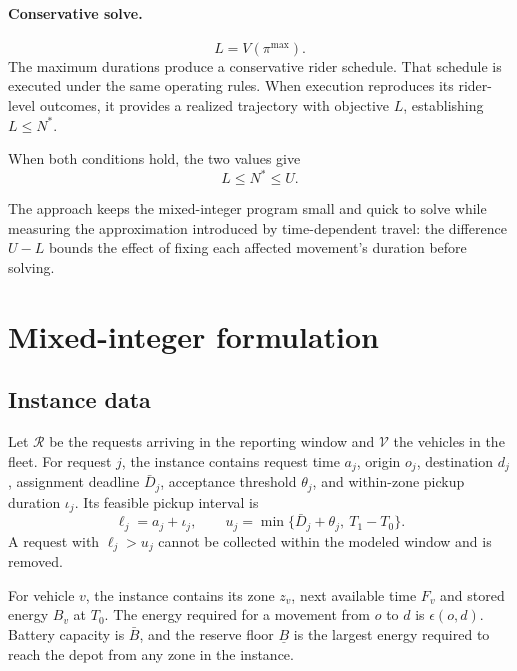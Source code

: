 \paragraph{Conservative solve.}
\begin{equation}
  L = V(\pi^{\max}).
\end{equation}
The maximum durations produce a conservative rider schedule. That schedule is executed under the same
operating rules. When execution reproduces its rider-level outcomes, it provides a realized trajectory
with objective $L$, establishing $L\leq N^*$.

When both conditions hold, the two values give
\begin{equation}
  L \leq N^* \leq U.
  \label{eq:bracket}
\end{equation}

The approach keeps the mixed-integer program small and quick to solve while measuring the
approximation introduced by time-dependent travel: the difference $U-L$ bounds the effect of fixing
each affected movement's duration before solving.

\section{Mixed-integer formulation}
\label{sec:formulation}

\subsection{Instance data}

Let $\mathcal R$ be the requests arriving in the reporting window and $\mathcal V$ the vehicles in the
fleet. For request $j$, the instance contains request time $a_j$, origin $o_j$, destination $d_j$,
assignment deadline $\bar D_j$, acceptance threshold $\theta_j$, and within-zone pickup duration
$\iota_j$. Its feasible pickup interval is
\begin{equation}
  \ell_j = a_j + \iota_j,
  \qquad
  u_j = \min\{\bar D_j + \theta_j,\ T_1-T_0\}.
  \label{eq:pickup-window}
\end{equation}
A request with $\ell_j>u_j$ cannot be collected within the modeled window and is removed.

For vehicle $v$, the instance contains its zone $z_v$, next available time $F_v$ and stored energy
$B_v$ at $T_0$. The energy required for a movement from $o$ to $d$ is $\epsilon(o,d)$. Battery
capacity is $\bar B$, and the reserve floor $\underline B$ is the largest energy required to reach the
depot from any zone in the instance.

